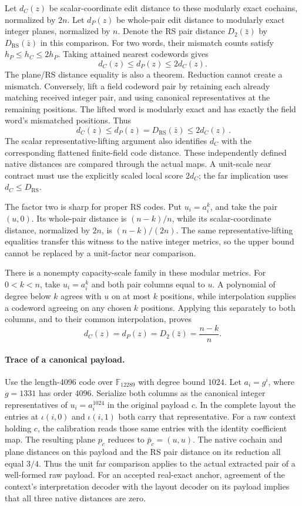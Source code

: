 Let \(d_C(z)\) be scalar-coordinate edit distance to these modularly exact
cochains, normalized by \(2n\). Let \(d_P(z)\) be whole-pair edit distance
to modularly exact integer planes, normalized by \(n\). Denote the RS pair
distance \(D_2(\bar z)\) by \(D_{\mathrm{RS}}(\bar z)\) in this comparison.
For two words, their mismatch counts satisfy
\(h_P\le h_C\le2h_P\). Taking attained nearest codewords gives
\[
 d_C(z)\le d_P(z)\le2d_C(z).
\]
The plane/RS distance equality is also a theorem. Reduction cannot create a
mismatch. Conversely, lift a field codeword pair by retaining each already
matching received integer pair, and using canonical representatives at the
remaining positions. The lifted word is modularly exact and has exactly the
field word's mismatched positions. Thus
\[
 \boxed{\ d_C(z)\le d_P(z)=D_{\mathrm{RS}}(\bar z)\le2d_C(z)\ }.
\]
The scalar representative-lifting argument also identifies \(d_C\) with
the corresponding flattened finite-field code distance. These independently
defined native distances are compared through the actual maps. A unit-scale
near contract must use the explicitly scaled local score \(2d_C\); the
far implication uses \(d_C\le D_{\mathrm{RS}}\).

The factor two is sharp for proper RS codes. Put \(u_i=a_i^k\), and take
the pair \((u,0)\). Its whole-pair distance is \((n-k)/n\), while its
scalar-coordinate distance, normalized by \(2n\), is \((n-k)/(2n)\).
The same representative-lifting equalities transfer this witness to the
native integer metrics, so the upper bound cannot be replaced by a
unit-factor near comparison.

There is a nonempty capacity-scale family in these modular metrics. For
\(0<k<n\), take \(u_i=a_i^k\) and both pair columns equal to \(u\).
A polynomial of degree below \(k\) agrees with \(u\) on at most \(k\)
positions, while interpolation supplies a codeword agreeing on any chosen
\(k\) positions. Applying this separately to both columns, and to their
common interpolation, proves
\[
 d_C(z)=d_P(z)=D_2(\bar z)=\frac{n-k}{n}.
\]

\paragraph{Trace of a canonical payload.}
Use the length-4096 code over \(\mathbb F_{12289}\) with degree bound \(1024\).
Let \(a_i=g^i\), where \(g=1331\) has order \(4096\). Serialize both columns
as the canonical integer
representatives of \(u_i=a_i^{1024}\) in the original payload \(c\). In the
complete layout the entries at \(\iota(i,0)\) and \(\iota(i,1)\) both carry
that representative. For a raw context holding \(c\), the calibration reads
those same entries with the identity coefficient map. The resulting plane
\(p_c\) reduces to \(\bar p_c=(u,u)\). The native cochain and plane distances
on this payload and the RS pair distance on its reduction all equal \(3/4\).
Thus the unit far comparison applies to the actual extracted pair of a
well-formed raw payload. For an accepted real-exact anchor, agreement of the
context's interpretation decoder with the layout decoder on its payload
implies that all three native distances are zero.


